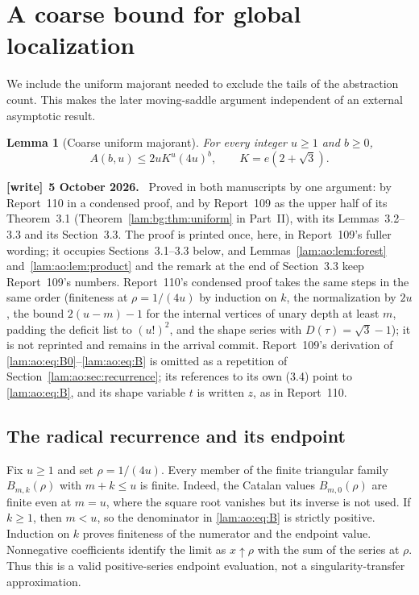 \documentclass[11pt,a4paper]{article}
\numberwithin{equation}{section}
\newtheorem{lemma}[theorem]{Lemma}
\theoremstyle{remark}
\newenvironment{writenote}[1][]{\par\smallskip\begingroup\small
 \noindent\textbf{[write]}\if\relax\detokenize{#1}\relax\else~\textbf{#1.}\fi\ }%
 {\par\endgroup\smallskip}
\begin{document}
\section{A coarse bound for global localization}\label{lam:ao:sec:coarse}
We include the uniform majorant needed to exclude the tails of the abstraction count. This makes the later moving-saddle argument independent of an external asymptotic result.
\begin{lemma}[Coarse uniform majorant]\label{lam:ao:lem:coarse}
For every integer $u\ge1$ and $b\ge0$,
\begin{equation}\label{lam:ao:eq:coarse}
 A(b,u)\le2uK^u(4u)^b,\qquad K=e(2+\sqrt3).
\end{equation}
\end{lemma}
\begin{writenote}[5 October 2026]
Proved in both manuscripts by one argument: by Report~110 in a condensed proof, and by Report~109 as the upper half of its Theorem~3.1 (Theorem~\ref{lam:bg:thm:uniform} in Part~II), with its Lemmas~3.2--3.3 and its Section~3.3. The proof is printed once, here, in Report~109's fuller wording; it occupies Sections~3.1--3.3 below, and Lemmas~\ref{lam:ao:lem:forest} and~\ref{lam:ao:lem:product} and the remark at the end of Section~3.3 keep Report~109's numbers. Report~110's condensed proof takes the same steps in the same order (finiteness at $\rho=1/(4u)$ by induction on $k$, the normalization by $2u$, the bound $2(u-m)-1$ for the internal vertices of unary depth at least $m$, padding the deficit list to $(u!)^2$, and the shape series with $D(\tau)=\sqrt3-1$); it is not reprinted and remains in the arrival commit. Report~109's derivation of \eqref{lam:ao:eq:B0}--\eqref{lam:ao:eq:B} is omitted as a repetition of Section~\ref{lam:ao:sec:recurrence}; its references to its own (3.4) point to \eqref{lam:ao:eq:B}, and its shape variable $t$ is written $z$, as in Report~110.
\end{writenote}
\subsection{The radical recurrence and its endpoint}
Fix $u\ge1$ and set $\rho=1/(4u)$. Every member of the finite triangular family $B_{m,k}(\rho)$ with $m+k\le u$ is finite. Indeed, the Catalan values $B_{m,0}(\rho)$ are finite even at $m=u$, where the square root vanishes but its inverse is not used. If $k\ge1$, then $m<u$, so the denominator in \eqref{lam:ao:eq:B} is strictly positive. Induction on $k$ proves finiteness of the numerator and the endpoint value. Nonnegative coefficients identify the limit as $x\uparrow\rho$ with the sum of the series at $\rho$. Thus this is a valid positive-series endpoint evaluation, not a singularity-transfer approximation.
\end{document}
